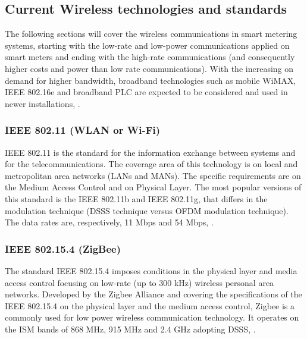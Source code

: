 \subsection{Current Wireless technologies and standards}
\label{subs:332}
The following sections will cover the wireless communications in smart metering systems, starting with the low-rate and low-power communications applied on smart meters and ending with the high-rate communications (and consequently higher costs and power than low rate communications). With the increasing on demand for higher bandwidth, broadband technologies such as mobile WiMAX, IEEE 802.16e and broadband \ac{PLC} are expected to be considered and used in newer installations, \cite{Mohassel2014}.



\subsubsection{IEEE 802.11 (\ac{WLAN} or Wi-Fi)}

IEEE 802.11 is the standard for the information exchange between systems and for the telecommunications. The coverage area of this technology is on local and metropolitan area networks (LANs and MANs). The specific requirements are on the Medium Access Control and on Physical Layer. The most popular versions of this standard is the IEEE 802.11b and IEEE 802.11g, that differs in the modulation technique (\ac{DSSS} technique versus  \ac{OFDM} modulation technique). The data rates are, respectively, 11 Mbps and 54 Mbps, \cite{Usman2013, ieee2012}.



\subsubsection{IEEE 802.15.4 (ZigBee)}

The standard IEEE 802.15.4 imposes conditions in the physical layer and media access control focusing on low-rate (up to 300 kHz) wireless personal area networks. Developed by the Zigbee Alliance and covering the specifications of the IEEE 802.15.4 on the physical layer and the medium access control, Zigbee is a commonly used for low power wireless communication technology. It operates on the \ac{ISM} bands of 868 MHz, 915 MHz and 2.4 GHz adopting \ac{DSSS}, \cite{Usman2013}.



